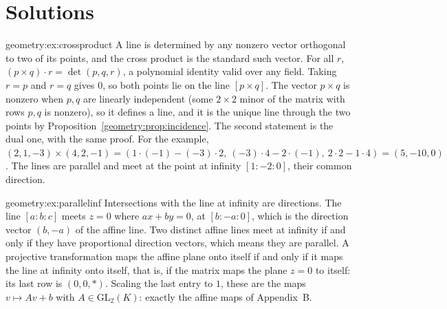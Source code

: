 \section{Solutions}

\begin{solution}{geometry:ex:crossproduct}
\idea A line is determined by any nonzero vector orthogonal to two of its points, and the cross product is the standard such vector.
\writeup For all $r$, $(p\times q)\cdot r=\det(p,q,r)$, a polynomial identity valid over any field. Taking $r=p$ and $r=q$ gives $0$, so both
points lie on the line $[p\times q]$. The vector $p\times q$ is nonzero when $p,q$ are linearly independent (some $2\times2$ minor of the
matrix with rows $p,q$ is nonzero), so it defines a line, and it is the unique line through the two points by Proposition~\ref{geometry:prop:incidence}.
The second statement is the dual one, with the same proof. For the example, $(2,1,-3)\times(4,2,-1)=(1\cdot(-1)-(-3)\cdot2,\ (-3)\cdot4-2\cdot(-1),\
2\cdot2-1\cdot4)=(5,-10,0)$. The lines are parallel and meet at the point at infinity $[1:-2:0]$, their common direction.
\end{solution}

\begin{solution}{geometry:ex:parallelinf}
\idea Intersections with the line at infinity are directions.
\writeup The line $[a:b:c]$ meets $z=0$ where $ax+by=0$, at $[b:-a:0]$, which is the direction vector $(b,-a)$ of the affine line. Two distinct
affine lines meet at infinity if and only if they have proportional direction vectors, which means they are parallel. A projective
transformation maps the affine plane onto itself if and only if it maps the line at infinity onto itself, that is, if the matrix maps the plane
$z=0$ to itself: its last row is $(0,0,\ast)$. Scaling the last entry to $1$, these are the maps $v\mapsto Av+b$ with $A\in\mathrm{GL}_2(K)$:
exactly the affine maps of Appendix~B.
\end{solution}

